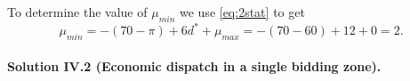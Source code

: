 \documentclass[11pt,a4paper,fleqn]{scrartcl}
\def\m{\mu}
\begin{document}
\begin{enumerate}[(a)]
 To determine the value of $\mu_{min}$ we use \eqref{eq:2stat} to get
 \begin{equation*}
   \m_{min} = -(70-\pi) + 6d^* + \mu_{max} = -(70 - 60) + 12 + 0 = 2.
 \end{equation*}
 
 \newpage
\end{enumerate}
\paragraph{Solution IV.2 \normalsize (Economic dispatch in a single bidding zone).}~\\
\end{document}
